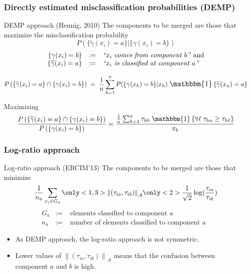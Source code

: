 \begin{frame}
\frametitle{Directly estimated misclassification probabilities (DEMP)}
\small
\begin{block}{DEMP approach (Hennig, 2010)}
The components to be merged are those that maximize the misclassification probability
\[
P\left( \{ \widetilde{\gamma}(x_i) = a \} | \{ \gamma(x_i) = b \} \right)
\]
\[
\begin{array}{rcl}
\{ \gamma(x_i) = b \} &:=& \text{\emph{``$x_i$ comes from component $b$''}} \text{ and} \\
\{\widetilde{\gamma}(x_i) = a\} &:=& \text{\emph{``$x_i$ is classified at component $a$''}}
\end{array}
\]
\end{block}

\[
P\left( \{ \widetilde{\gamma}(x_i) = a \} \cap \{ \gamma(x_i) = b\} \right) \;=\; 
\frac{1}{n}%
\sum_{h=1}^n P( \{ \gamma(x_h) = b \} | x_h) \;
\mathlarger{\mathbbm{1}}\left\{ \widetilde{\gamma}(x_n) = a  \right\}
\]

Maximizing%
\[
\frac{P\left( \{ \widetilde{\gamma}(x_i) = a \} \cap \{ \gamma(x_i) = b \} \right)}{ P\left( \{ \gamma(x_i) = b \} \right) } = 
\frac{%
  \frac{1}{n}%
  \sum_{h=1}^n \tau_{hb} \;
  \mathlarger{\mathbbm{1}}\left\{ \forall \ell \; \tau_{ha} \geq \tau_{h\ell}  \right\}
}{%
  \pi_b
}
\]
\end{frame}

\begin{frame}[t]
\frametitle{Log-ratio approach}
\small
\begin{block}{Log-ratio approach (ERCIM'13)}
The components to be merged are those that minimize
\[
\frac{1}{n_a} \sum_{x_i \in G_a}%
\only<1,3>{\left\| (\tau_{ia}, \tau_{ib}) \right\|_{\mathcal{A}}}%
\only<2>{\frac{1}{\sqrt{2}} \log (\frac{\tau_{ia}}{\tau_{ib}})}
\]
\[\begin{array}{rcl}
G_a &:=& \text{ elements classified to component $a$ } \\
n_a &:=& \text{ number of elements classified to component $a$ }
\end{array}\]
\end{block}


\begin{itemize}
\item As DEMP approach, the log-ratio approach is not symmetric. 
\item Lower values of $\left\| (\tau_{ia}, \tau_{ib}) \right\|_{\mathcal{A}}$ means that the confusion between component $a$ and $b$ is high.
\end{itemize}

\end{frame}

